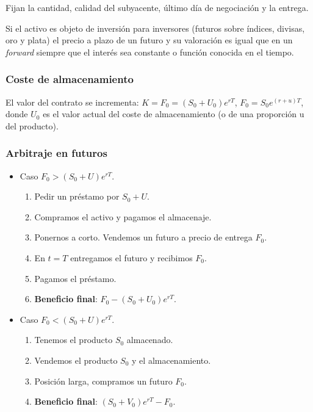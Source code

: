 \documentclass[
10pt, %
a4paper, %
oneside, %
headinclude,footinclude, %
BCOR5mm, %
]{scrartcl}
\newcommand{\n}[1]{\textbf{#1}}
\newcommand{\cur}[1]{\textit{#1}}
\newcommand{\sub}[1]{_{#1}}
\newcommand{\pot}[1]{^{#1}}
\newcommand{\f}[1]{{\large{${#1}$}}}
\newcounter{ex}
\newcounter{prop}
\begin{document}
		Fijan la cantidad, calidad del subyacente, último día de negociación y la entrega.

		Si el activo es objeto de inversión para inversores (futuros sobre índices, divisas, oro y plata) el precio a plazo de un futuro y su valoración es igual que en un \cur{forward} siempre que el interés sea constante o función conocida en el tiempo.

		\subsubsection{Coste de almacenamiento}

			El valor del contrato se incrementa: \f{K = F\sub{0} = (S\sub{0} + U\sub{0}) e\pot{rT}}, \f{F\sub{0} = S\sub{0} e\pot{(r+u)T}}, donde \f{U\sub{0}} es el valor actual del coste de almacenamiento (o de una proporción u del producto).

		\subsubsection{Arbitraje en futuros}

			\begin{itemize} 
				\item Caso \f{F\sub{0} > (S\sub{0} + U)e\pot{rT}}. 
				\begin{enumerate}
					\item Pedir un préstamo por \f{S\sub{0}+U}.
					\item Compramos el activo y pagamos el almacenaje.
					\item Ponernos a corto. Vendemos un futuro a precio de entrega \f{F\sub{0}}.
					\item En \f{t = T} entregamos el futuro y recibimos \f{F\sub{0}}. 
					\item Pagamos el préstamo.
					\item \n{Beneficio final}: \f{F\sub{0} - (S\sub{0}+U\sub{0}) e\pot{rT}}.
				\end{enumerate}

				\item Caso \f{F\sub{0} < (S\sub{0}+U)e\pot{rT}}.
				\begin{enumerate}
					\item Tenemos el producto \f{S\sub{0}} almacenado.
					\item Vendemos el producto \f{S\sub{0}} y el almacenamiento.
					\item Posición larga, compramos un futuro \f{F\sub{0}}.
					\item \n{Beneficio final}: \f{(S\sub{0} + V\sub{0}) e\pot{rT} - F\sub{0}}.
				\end{enumerate}
			\end{itemize}
\end{document}
